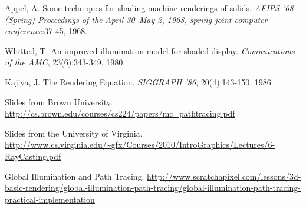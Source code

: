 \documentclass[12pt,journal]{IEEEtran}
\begin{document}
\begin{thebibliography}{5}

Appel, A. Some techniques for shading machine renderings of solids. \emph{AFIPS '68 (Spring) Proceedings of the April 30--May 2, 1968, spring joint computer conference}:37-45, 1968.

Whitted, T. An improved illumination model for shaded display. \emph{Comunications of the AMC}, 23(6):343-349, 1980.

Kajiya, J. The Rendering Equation. \emph{SIGGRAPH '86}, 20(4):143-150, 1986.

Slides from Brown University.
\url{http://cs.brown.edu/courses/cs224/papers/mc_pathtracing.pdf}

Slides from the University of Virginia.
\url{http://www.cs.virginia.edu/~gfx/Courses/2010/IntroGraphics/Lectures/6-RayCasting.pdf}

Global Illumination and Path Tracing.
\url{http://www.scratchapixel.com/lessons/3d-basic-rendering/global-illumination-path-tracing/global-illumination-path-tracing-practical-implementation}

\end{thebibliography}

\end{document}
